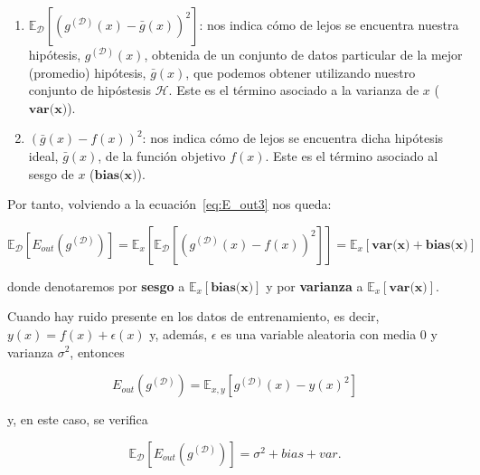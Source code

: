 \begin{enumerate}
    \item $\mathbb{E}_{\mathcal{D}}[{(g^{\mathcal{(D)}}(x) - \bar{g}(x))}^2]$: nos indica cómo de lejos se encuentra nuestra hipótesis, $g^{\mathcal{(D)}}(x)$, obtenida de un conjunto de datos particular de la mejor (promedio) hipótesis, $\bar{g}(x)$, que podemos obtener utilizando nuestro conjunto de hipóstesis $\mathcal{H}$. Este es el término asociado a la varianza de $x$ ($\textbf{var(x)}$).
    \item ${(\bar{g}(x) - f(x))}^2$: nos indica cómo de lejos se encuentra dicha hipótesis ideal, $\bar{g}(x)$, de la función objetivo $f(x)$. Este es el término asociado al sesgo de $x$ ($\textbf{bias(x)}$).\newline
\end{enumerate}

Por tanto, volviendo a la ecuación~\eqref{eq:E_out3} nos queda:

\begin{equation}\label{eq:E_out8}
    \mathbb{E}_{\mathcal{D}}[E_{out}(g^{\mathcal{(D)}})] = \mathbb{E}_{x}[\mathbb{E}_{\mathcal{D}}[{(g^{\mathcal{(D)}}(x) - f(x))}^2]] = \mathbb{E}_{x}[\textbf{var(x)} + \textbf{bias(x)}]
\end{equation}

donde denotaremos por \textbf{sesgo} a $\mathbb{E}_{x}[\textbf{bias(x)}]$ y por \textbf{varianza} a $\mathbb{E}_{x}[\textbf{var(x)}]$.\newline

\begin{observacion}
    Cuando hay ruido presente en los datos de entrenamiento, es decir, $y(x) = f(x) + \epsilon(x)$ y, además, $\epsilon$ es una variable aleatoria con media $0$ y varianza $\sigma^{2}$, entonces

    \[ E_{out}(g^{(\mathcal{D})}) = \mathbb{E}_{x, y}[g^{(\mathcal{D})}(x)-{y(x)}^{2}] \]

    y, en este caso, se verifica

    \[ \mathbb{E}_{\mathcal{D}}[E_{out}(g^{(\mathcal{D})})] = \sigma^{2} + bias + var. \]
\end{observacion}

